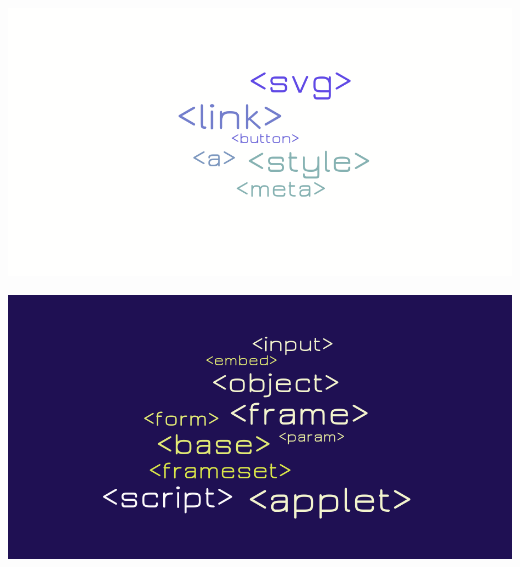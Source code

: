 \documentclass[graphic, aspectratio=169]{beamer}
\begin{document}
{\includegraphics[width=\paperwidth,height=\paperheight]{images/ok_tags.png}}
\begin{frame}
\end{frame}

{\includegraphics[width=\paperwidth,height=\paperheight]{images/deprecated_tags.png}}
\begin{frame}
\end{frame}
\end{document}
